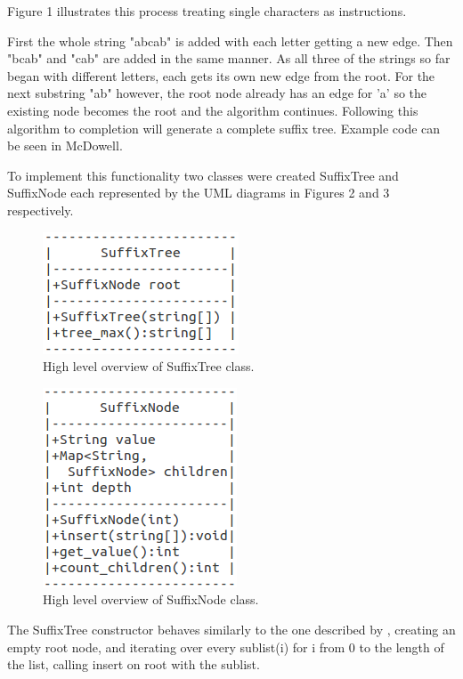 \documentclass[9pt,nocopyrightspace]{sigplanconf}
\begin{document}
Figure 1 illustrates this process treating single characters as instructions.

First the whole string "abcab" is added with each letter getting a new edge.
Then "bcab" and "cab" are added in the same manner.
As all three of the strings so far began with different letters, each gets its own new edge from the root.
For the next substring "ab" however, the root node already has an edge for 'a' so the existing node becomes the root and the algorithm continues.
Following this algorithm to completion will generate a complete suffix tree.
Example code can be seen in McDowell\cite{ctci01}.

To implement this functionality two classes were created SuffixTree and SuffixNode each represented by the UML diagrams in Figures 2 and 3 respectively. 

\begin{figure}
\begin{center}
\includegraphics{tree}
\caption{High level overview of SuffixTree class.}
\end{center}
\end{figure}

\begin{figure}
\begin{center}
\includegraphics{node}
\caption{High level overview of SuffixNode class.}
\end{center}
\end{figure}

The SuffixTree constructor behaves similarly to the one described by \cite{ctci01}, creating an empty root node, and iterating over every sublist(i) for i from 0 to the length of the list, calling insert on root with the sublist. 
\end{document}
